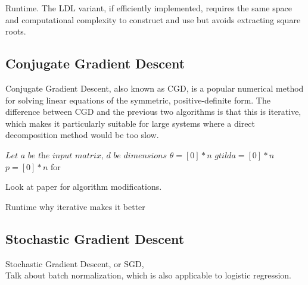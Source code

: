 \documentclass{article}
\makeatletter
\theoremstyle{plain}
\theoremstyle{definition}
\theoremstyle{remark}
\def\BState{\State\hskip-\ALG@thistlm}
\makeatother
\begin{document}
\noindent
Runtime. The LDL variant, if efficiently implemented, requires the same space and computational complexity to construct and use but avoids extracting square roots. 

\subsection{Conjugate Gradient Descent}

Conjugate Gradient Descent, also known as CGD, is a popular numerical method for solving linear equations of the symmetric, positive-definite form. The difference between CGD and the previous two algorithms is that this is iterative, which makes it particularly suitable for large systems where a direct decomposition method would be too slow. 

\begin{algorithm}[H]
\caption{}\label{euclid}
\begin{algorithmic}[1]
\State $\textit{Let a be the input matrix, d be dimensions}$
\State $\theta = [0]*n$
\State $gtilda = [0]*n$
\State $p = [0]*n$
for

\EndFor
\end{algorithmic}
\end{algorithm}

Look at paper for algorithm modifications.

Runtime why iterative makes it better

\subsection{Stochastic Gradient Descent}

Stochastic Gradient Descent, or SGD, \\

\noindent
Talk about batch normalization, which is also applicable to logistic regression.

\begin{algorithm}[H]
\caption{}\label{euclid}
\end{algorithm}
\end{document}

